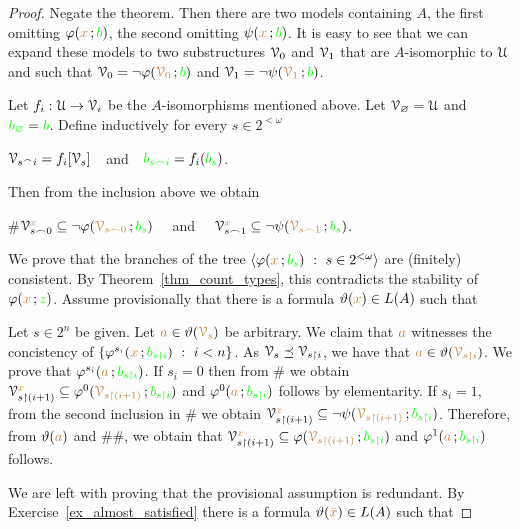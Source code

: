 \documentclass[creche.tex]{subfiles}
\begin{document}
\begin{proof}
  Negate the theorem. 
  Then there are two models containing $A$, the first omitting $\varphi({\color{brown} x}\,;{\color{green} b})$, the second omitting $\psi({\color{brown} x}\,;{\color{green} b})$.
  It is easy to see that we can expand these models to two substructures $\EuScript V_0$ and $\EuScript V_1$ that are $A$-isomorphic to $\EuScript U$ and such that $\EuScript V_0=\neg\varphi({\color{brown}\EuScript V_0}\,;{\color{green} b})$ and $\EuScript V_1=\neg\psi({\color{brown}\EuScript V_1}\,;{\color{green} b})$.

  Let $f_i:\EuScript U\to\EuScript V_i$ be the $A$-isomorphisms mentioned above. 
  Let $\EuScript V_\varnothing=\EuScript U$ and ${\color{green} b_\varnothing}={\color{green} b}$.
  Define inductively for every $s\in 2^{<\omega}$ 

  \hfil$\EuScript V_{s^\frown i}=f_i[\EuScript V_s]$\ \ and\ \ ${\color{green} b_{s\frown i}}=f_i({\color{green} b_s})$.

  Then from the inclusion above we obtain

  \#\hfil$\EuScript V_{s\frown0}^{{\color{brown} x}}\subseteq\neg\varphi({\color{brown}\EuScript V_{s\frown0}}\,;{\color{green} b_s})$ \ \ and \ \  $\EuScript V_{s\frown1}^{{\color{brown} x}}\subseteq\neg\psi({\color{brown}\EuScript V_{s\frown1}}\,;{\color{green} b_s})$.

  We prove that the branches of the tree $\<\phi({\mr x}\,;{\gr b_s})\ :\  s\in2^{<\omega}\>$ are (finitely) consistent. 
  By Theorem~\ref{thm_count_types}, this contradicts the stability of $\varphi({\color{brown} x}\,;{\color{green} z})$.
  Assume provisionally that there is a formula $\vartheta({\color{brown} x})\in L(A)$ such that
  
  
  Let $s\in2^n$ be given.
  Let ${\color{brown} a}\in\vartheta({\color{brown}\EuScript V_s})$ be arbitrary. We claim that ${\color{brown} a}$ witnesses the concistency of  $\{\phi^{s_i}({\mr x}\,;{\gr b_{s\restriction i}})\ :\ i<n\}$.
  As $\EuScript V_s\preceq\EuScript V_{s\restriction i}$, we have that ${\color{brown} a}\in\vartheta({\color{brown}\EuScript V_{s\restriction i}})$.
  We prove that $\varphi^{s_i}({\color{brown} a}\,;{\color{green} b_{s\restriction i}})$.
  If $s_i=0$ then from \# we obtain $\EuScript V_{s\restriction(i+1)}^{{\color{brown} x}}\subseteq\varphi^0({\color{brown}\EuScript V_{s\restriction(i+1)}}\,;{\color{green} b_{s\restriction i}})$ and $\varphi^0({\color{brown} a}\,;{\color{green} b_{s\restriction i}})$ follows by elementarity.
  If $s_i=1$, from the second inclusion in \# we obtain $\EuScript V_{s\restriction(i+1)}^{{\color{brown} x}}\subseteq\neg\psi({\color{brown}\EuScript V_{s\restriction(i+1)}}\,;{\color{green} b_{s\restriction i}})$.
  Therefore, from $\vartheta({\color{brown} a})$ and \#\#, we obtain that $\EuScript V_{s\restriction(i+1)}^{{\color{brown} x}}\subseteq\varphi({\color{brown}\EuScript V_{s\restriction(i+1)}}\,;{\color{green} b_{s\restriction i}})$ and $\varphi^1({\color{brown} a}\,;{\color{green} b_{s\restriction i}})$ follows.

  We are left with proving that the provisional assumption is redundant.
  By Exercise~\ref{ex_almost_satisfied} there is a formula $\vartheta({\color{brown}\bar x})\in L(A)$ such that


\end{proof}
\end{document}
